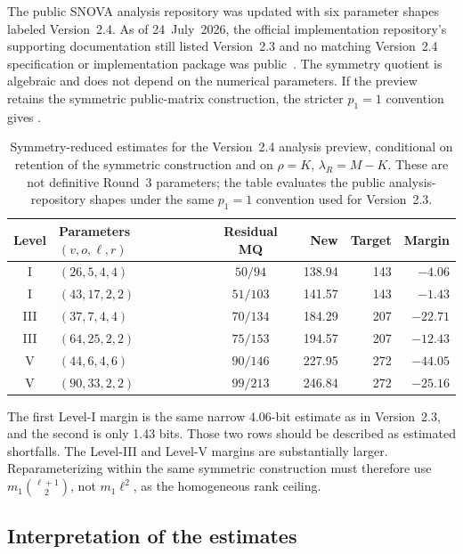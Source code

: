 \documentclass[11pt]{article}
\newcommand{\SNOVA}{\textsf{SNOVA}}
\begin{document}
The public \SNOVA{} analysis repository was updated with six parameter shapes labeled Version~2.4.  As of 24~July~2026, the official implementation repository's supporting documentation still listed Version~2.3 and no matching Version~2.4 specification or implementation package was public~\cite{SNOVA23,SNOVA24Preview}.  The symmetry quotient is algebraic and does not depend on the numerical parameters.  If the preview retains the symmetric public-matrix construction, the stricter $p_1=1$ convention gives .

\begin{table}[t]
\centering
\caption{Symmetry-reduced estimates for the Version~2.4 analysis preview, conditional on retention of the symmetric construction and on $\rho=K$, $\lambda_R=M-K$.  These are not definitive Round~3 parameters; the table evaluates the public analysis-repository shapes under the same $p_1=1$ convention used for Version~2.3.}\label{tab:snova24}
\small
\setlength{\tabcolsep}{5pt}
\begin{tabular}{@{}c l c r r r@{}}
\toprule
Level & Parameters $(v,o,\ell,r)$ & Residual MQ & New & Target & Margin\\
\midrule
I   & $(26,5,4,4)$   & $50/94$  & 138.94 & 143 & $-4.06$\\
I   & $(43,17,2,2)$  & $51/103$ & 141.57 & 143 & $-1.43$\\
III & $(37,7,4,4)$   & $70/134$ & 184.29 & 207 & $-22.71$\\
III & $(64,25,2,2)$  & $75/153$ & 194.57 & 207 & $-12.43$\\
V   & $(44,6,4,6)$   & $90/146$ & 227.95 & 272 & $-44.05$\\
V   & $(90,33,2,2)$  & $99/213$ & 246.84 & 272 & $-25.16$\\
\bottomrule
\end{tabular}
\end{table}

The first Level-I margin is the same narrow 4.06-bit estimate as in Version~2.3, and the second is only 1.43 bits.  Those two rows should be described as estimated shortfalls.  The Level-III and Level-V margins are substantially larger.  Reparameterizing within the same symmetric construction must therefore use $m_1\binom{\ell+1}{2}$, not $m_1\ell^2$, as the homogeneous rank ceiling.

\subsection{Interpretation of the estimates}
\end{document}
